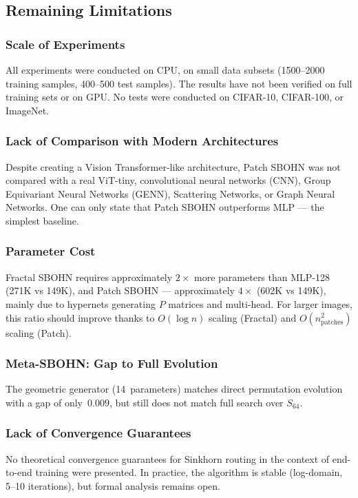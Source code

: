 \documentclass[11pt,a4paper]{report}
\begin{document}
\subsection{Remaining Limitations}

\subsubsection{Scale of Experiments}
All experiments were conducted on CPU, on small data subsets (1500--2000 training samples, 400--500 test samples).  The results have not been verified on full training sets or on GPU.  No tests were conducted on CIFAR-10, CIFAR-100, or ImageNet.

\subsubsection{Lack of Comparison with Modern Architectures}
Despite creating a Vision Transformer-like architecture, Patch SBOHN was not compared with a real ViT-tiny, convolutional neural networks (CNN), Group Equivariant Neural Networks (GENN), Scattering Networks, or Graph Neural Networks.  One can only state that Patch SBOHN outperforms MLP --- the simplest baseline.

\subsubsection{Parameter Cost}
Fractal SBOHN requires approximately $2\times$ more parameters than MLP-128 (271K vs 149K), and Patch SBOHN --- approximately $4\times$ (602K vs 149K), mainly due to hypernets generating $P$ matrices and multi-head.  For larger images, this ratio should improve thanks to $O(\log n)$ scaling (Fractal) and $O(n_{\mathrm{patches}}^2)$ scaling (Patch).

\subsubsection{Meta-SBOHN: Gap to Full Evolution}
The geometric generator (14~parameters) matches direct permutation evolution with a gap of only~$0.009$, but still does not match full search over $S_{64}$.

\subsubsection{Lack of Convergence Guarantees}
No theoretical convergence guarantees for Sinkhorn routing in the context of end-to-end training were presented.  In practice, the algorithm is stable (log-domain, 5--10 iterations), but formal analysis remains open.
\end{document}
